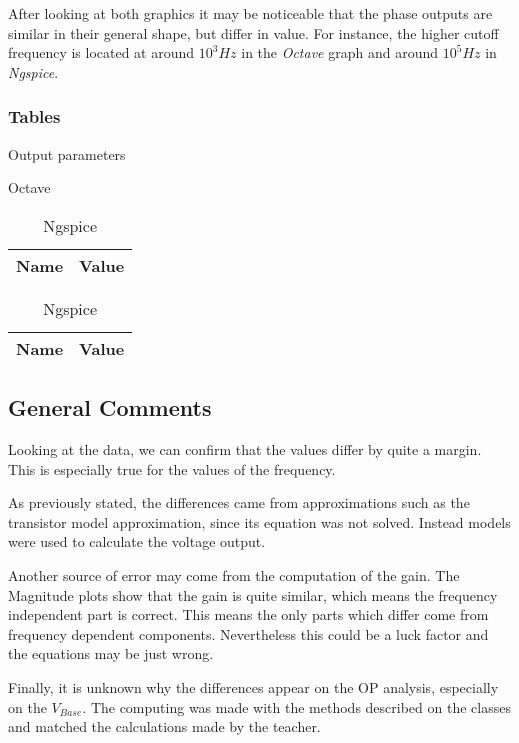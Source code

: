 \indent

After looking at both graphics it may be noticeable that the phase outputs are similar in their general shape, but differ in value. For instance, the higher cutoff frequency is located at around $10^3 Hz$ in the {\it Octave} graph and around $10^5 Hz$ in {\it Ngspice}.

 

\subsubsection*{Tables}

\begin{table}[H]
    \caption{Output parameters}
    \begin{subtable}{.5\linewidth}
      \centering
        \caption{Octave}
        \begin{tabular}{ll}
        \hline    
        {\bf Name} & {\bf Value} \\ \hline
        
        \end{tabular}
        \label{tab:OutParamOc}
    \end{subtable}%
    \begin{subtable}{.5\linewidth}
      \centering
        \caption{Ngspice}
        \begin{tabular}{ll}
        \hline    
        {\bf Name} & {\bf Value} \\ \hline
        
        \end{tabular}
        \label{tab:OutParamNG}
    \end{subtable} 
    \label{tab:OutParam}
\end{table}
\indent



\subsection{General Comments}

\indent

Looking at the data, we can confirm that the values differ by quite a margin. This is especially true for the values of the frequency.

As previously stated, the differences came from approximations such as the transistor model approximation, since its equation  was not solved. Instead models were used to calculate the voltage output.

Another source of error may come from the computation of the gain. The Magnitude plots show that the gain is quite similar, which means the frequency independent part is correct. This means the only parts which differ come from frequency dependent components. Nevertheless this could be a luck factor and the equations may be just wrong.

Finally, it is unknown why the differences appear on the OP analysis, especially on the $V_{Base}$. The computing was made with the methods described on the classes and matched the calculations made by the teacher.

